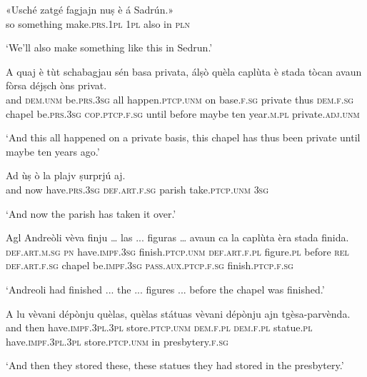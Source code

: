 \begin{linenumbers}
\gll «Usché zatgé fagjajn nuṣ è á Sadrún.»   \\
so something make.\textsc{prs.1pl} \textsc{1pl} also in \textsc{pln} \ \\
\end{linenumbers}
\medskip
\glt `We’ll also make something like this in Sedrun.'
\medskip

\begin{linenumbers}
\gll  A quaj è tùt schabagjau sén basa privata, álṣò quèla caplùta è stada tòcan avaun fòrsa déjṣch òns privat.  \\
and \textsc{dem.unm} be.\textsc{prs.3sg} all happen.\textsc{ptcp.unm} on base.\textsc{f.sg} private thus \textsc{dem.f.sg} chapel  be.\textsc{prs.3sg} \textsc{cop.ptcp.f.sg} until before maybe ten year.\textsc{m.pl} private.\textsc{adj.unm}\\
\end{linenumbers}
\medskip
\glt `And this all happened on a private basis, this chapel has thus been private until maybe ten years ago.'
\medskip

\begin{linenumbers}
\gll  Ad ùṣ ò la plajv ṣurprjú aj.  \\
and now have.\textsc{prs.3sg} \textsc{def.art.f.sg} parish take.\textsc{ptcp.unm} \textsc{3sg}  \\
\end{linenumbers}
\medskip
\glt `And now the parish has taken it over.'
\medskip

\begin{linenumbers}
\gll  Agl Andreòli vèva finju … las ... figuras … avaun ca la caplùta èra stada finida. \\
 \textsc{def.art.m.sg} \textsc{pn} have.\textsc{impf.3sg} finish.\textsc{ptcp.unm} {} \textsc{def.art.f.pl} {} figure.\textsc{pl} {} before \textsc{rel} \textsc{def.art.f.sg} chapel be.\textsc{impf.3sg} \textsc{pass.aux.ptcp.f.sg} finish.\textsc{ptcp.f.sg} \\
\end{linenumbers}
\medskip
\glt `Andreoli had finished ... the ... figures ... before the chapel was finished.'
\medskip

\begin{linenumbers}
\gll  A lu vèvani dépònju quèlas, quèlas státuas vèvani dépònju ajn tgèsa-parvènda.\\
and then have.\textsc{impf.3pl.3pl} store.\textsc{ptcp.unm} \textsc{dem.f.pl} \textsc{dem.f.pl} statue.\textsc{pl} have.\textsc{impf.3pl.3pl} store.\textsc{ptcp.unm} in presbytery.\textsc{f.sg}\\
\end{linenumbers}
\medskip
\glt `And then they stored these, these statues they had stored in the presbytery.'
\medskip

